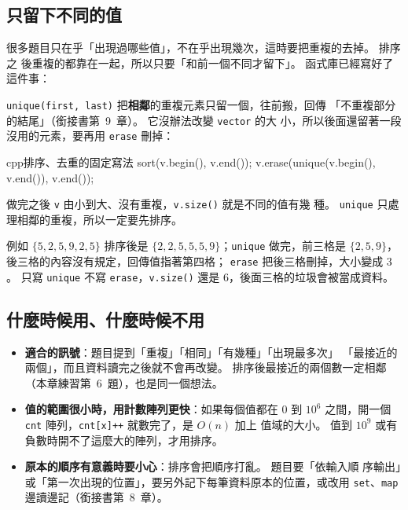 \subsection{只留下不同的值}

很多題目只在乎「出現過哪些值」，不在乎出現幾次，這時要把重複的去掉。 排序之
後重複的都靠在一起，所以只要「和前一個不同才留下」。 函式庫已經寫好了這件事：

\begin{bridgerecap}
\texttt{unique(first, last)} 把\textbf{相鄰}的重複元素只留一個，往前搬，回傳
「不重複部分的結尾」（銜接書第~9~章）。 它沒辦法改變 \texttt{vector} 的大
小，所以後面還留著一段沒用的元素，要再用 \texttt{erase} 刪掉：
\begin{code}{cpp}{排序、去重的固定寫法}
sort(v.begin(), v.end());
v.erase(unique(v.begin(), v.end()), v.end());
\end{code}
做完之後 \texttt{v} 由小到大、沒有重複，\texttt{v.size()} 就是不同的值有幾
種。 \texttt{unique} 只處理相鄰的重複，所以一定要先排序。
\end{bridgerecap}

例如 $\{5, 2, 5, 9, 2, 5\}$ 排序後是 $\{2, 2, 5, 5, 5, 9\}$；\texttt{unique}
做完，前三格是 $\{2, 5, 9\}$，後三格的內容沒有規定，回傳值指著第四格；
\texttt{erase} 把後三格刪掉，大小變成 $3$。 只寫 \texttt{unique} 不寫
\texttt{erase}，\texttt{v.size()} 還是 $6$，後面三格的垃圾會被當成資料。

\subsection{什麼時候用、什麼時候不用}

\begin{itemize}
\item \textbf{適合的訊號}：題目提到「重複」「相同」「有幾種」「出現最多次」
「最接近的兩個」，而且資料讀完之後就不會再改變。 排序後最接近的兩個數一定相鄰
（本章練習第~6~題），也是同一個想法。
\item \textbf{值的範圍很小時，用計數陣列更快}：如果每個值都在 $0$ 到 $10^6$
之間，開一個 \texttt{cnt} 陣列，\texttt{cnt[x]++} 就數完了，是 $O(n)$ 加上
值域的大小。 值到 $10^9$ 或有負數時開不了這麼大的陣列，才用排序。
\item \textbf{原本的順序有意義時要小心}：排序會把順序打亂。 題目要「依輸入順
序輸出」或「第一次出現的位置」，要另外記下每筆資料原本的位置，或改用
\texttt{set}、\texttt{map} 邊讀邊記（銜接書第~8~章）。
\end{itemize}

